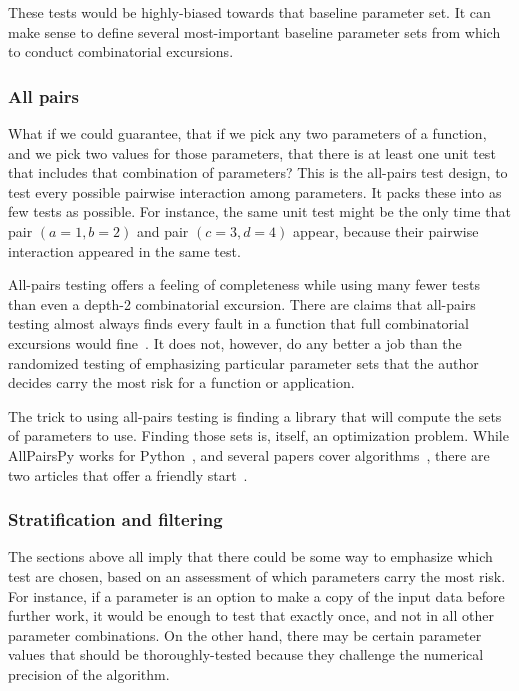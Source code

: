\documentclass[fleqn,10pt]{olplainarticle}
\begin{document}
These tests would be highly-biased towards that baseline parameter set.
It can make sense to define several most-important baseline
parameter sets from which to conduct combinatorial excursions.


\subsubsection{All pairs}
What if we could guarantee, that if we pick any two parameters
of a function, and we pick two values for those parameters,
that there is at least one unit test that includes that combination
of parameters? This is the all-pairs test design, to test
every possible pairwise interaction among parameters.
It packs these into as few tests as possible. For instance,
the same unit test might be the only time that pair
$(a=1, b=2)$ and pair $(c=3, d=4)$ appear, because their
pairwise interaction appeared in the same test.

All-pairs testing offers a feeling of completeness while
using many fewer tests than even a depth-2 combinatorial
excursion. There are claims that all-pairs testing almost
always finds every fault in a function that full combinatorial
excursions would fine~\citep{Pairwise}. It does not, however,
do any better a job than the randomized testing of emphasizing
particular parameter sets that the author decides carry
the most risk for a function or application.

The trick to using all-pairs testing is finding a library
that will compute the sets of parameters to use. Finding
those sets is, itself, an optimization problem.
While AllPairsPy works for Python~\citep{allpairspy},
and several papers cover algorithms~\citep{tung2000automating,pezze2008},
there are two articles that offer a friendly start~\citep{blass2002,czerwoka2006}.


\subsubsection{Stratification and filtering}\label{sec:parameters-stratification}
The sections above all imply that there could be some way
to emphasize which test are chosen, based on an assessment
of which parameters carry the most risk. For instance, if
a parameter is an option to make a copy of the input data
before further work, it would be enough to test that exactly
once, and not in all other parameter combinations. On
the other hand, there may
be certain parameter values that should be thoroughly-tested
because they challenge the numerical precision of the algorithm.
\end{document}
